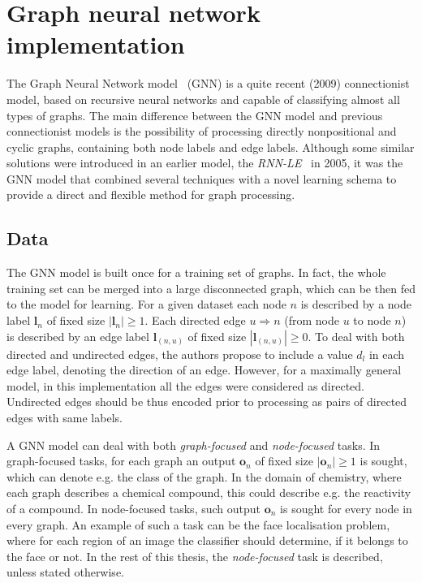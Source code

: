 
\chapter{Graph neural network implementation}

The Graph Neural Network model~\cite{scarselli2009graph} (GNN) is a quite recent (2009) connectionist model, based on recursive neural networks and capable of classifying almost all types of graphs. The main difference between the GNN model and previous connectionist models is the possibility of processing directly nonpositional and cyclic graphs, containing both node labels and edge labels. Although some similar solutions were introduced in an earlier model, the \emph{RNN-LE}~\cite{bianchini2005recursive} in 2005, it was the GNN model that combined several techniques with a novel learning schema to provide a direct and flexible method for graph processing.

\section{Data}
The GNN model is built once for a training set of graphs. In fact, the whole training set can be merged into a large disconnected graph, which can be then fed to the model for learning. For a given dataset each node $n$ is described by a node label $\bm{l}_n$ of fixed size $|\bm{l}_n| \geq 1$. Each directed edge $u \Rightarrow n$ (from node $u$ to node $n$) is described by an edge label $\bm{l}_{(n, u)}$ of fixed size $|\bm{l}_{(n, u)}| \geq 0$. To deal with both directed and undirected edges, the authors propose to include a value $d_l$ in each edge label, denoting the direction of an edge. However, for a maximally general model, in this implementation all the edges were considered as directed. Undirected edges should be thus encoded prior to processing as pairs of directed edges with same labels.

A GNN model can deal with both \emph{graph-focused} and \emph{node-focused} tasks. In graph-focused tasks, for each graph an output $\bm{o}_n$ of fixed size $|\bm{o}_n| \geq 1$ is sought, which can denote e.g. the class of the graph. In the domain of chemistry, where each graph describes a chemical compound, this could describe e.g. the reactivity of a compound. In node-focused tasks, such output $\bm{o}_n$ is sought for every node in every graph. An example of such a task can be the face localisation problem, where for each region of an image the classifier should determine, if it belongs to the face or not. In the rest of this thesis, the \emph{node-focused} task is described, unless stated otherwise.

